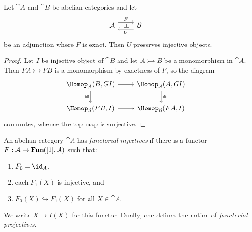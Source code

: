 \documentclass[../main.tex]{subfiles}
\begin{document}
\begin{lem}
    Let $\cat A$ and $\cat B$ be abelian categories and let
    \begin{equation*}
      \begin{tikzcd}
        \cat A \ar[r, "F"{name=leftadj}, shift left=2] & \cat B \ar[l, "U"{name=rightadj}, shift left=2]
        \ar[from=leftadj, to=rightadj, phantom, "\leftadj" marking]
      \end{tikzcd}
    \end{equation*}
  be an adjunction where $F$ is exact. Then $U$ preserves injective objects.
\end{lem}
\begin{proof}
    Let $I$ be injective object of \(\cat B\) and let $A \rightarrowtail B$ be a monomorphism in $\cat A$. Then $FA \rightarrowtail FB$ is a monomorphism by exactness of $F$, so the diagram
\[\begin{tikzcd}
	{\Hom[\cat A](B, GI)} & {\Hom[\cat A](A, GI)} \\
	{\Hom[\cat B](FB, I)} & {\Hom[\cat B](FA, I)}
	\arrow[from=1-1, to=1-2]
	\arrow["\cong"', from=1-1, to=2-1]
	\arrow["\cong", from=1-2, to=2-2]
	\arrow[two heads, from=2-1, to=2-2]
\end{tikzcd}\]
commutes, whence the top map is surjective.
\end{proof}

\begin{defn}
    An abelian category $\cat A$ has \emph{functorial injectives} if there is a functor $F\colon \cat A \to \catFunctor([1], \cat A)$ such that:
    \begin{enumerate}
        \item $F_0 = \id_{\cat A}$,
        \item each $F_1(X)$ is injective, and
        \item $F_0(X)\hookrightarrow F_1(X)$ for all $X\in \cat A$.
    \end{enumerate}
    We write $X\to I(X)$ for this functor. Dually, one defines the notion of \emph{functorial projectives}. 
\end{defn}
\end{document}
